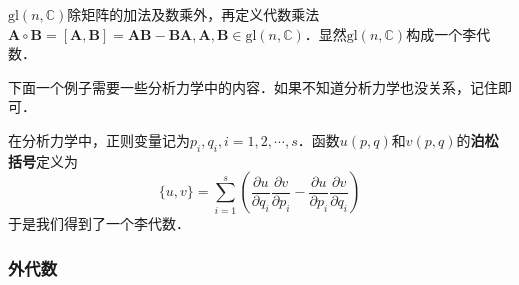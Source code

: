\begin{example}{}
$\mathrm{gl}(n, \mathbb C)$除矩阵的加法及数乘外，再定义代数乘法$\mathbf A\circ \mathbf B=[\mathbf A, \mathbf B] = \mathbf A \mathbf B - \mathbf B\mathbf A, \mathbf A, \mathbf B\in \mathrm{gl}(n, \mathbb C)$．显然$\mathrm{gl}(n,\mathbb C)$构成一个李代数．
\end{example}


下面一个例子需要一些分析力学中的内容．如果不知道分析力学也没关系，记住即可．
\begin{example}{}
在分析力学中，正则变量记为$p_i,q_i, i=1,2,\cdots, s$．函数$u(p,q)$和$v(p, q)$的\textbf{泊松括号}定义为\begin{equation}
\{u, v\}=\sum_{i=1}^{s}\left(\frac{\partial u}{\partial q_{i}} \frac{\partial v}{\partial p_{i}}-\frac{\partial u}{\partial p_{i}} \frac{\partial v}{\partial q_{i}}\right)
\end{equation}
于是我们得到了一个李代数．
\end{example}

\subsubsection{外代数}

